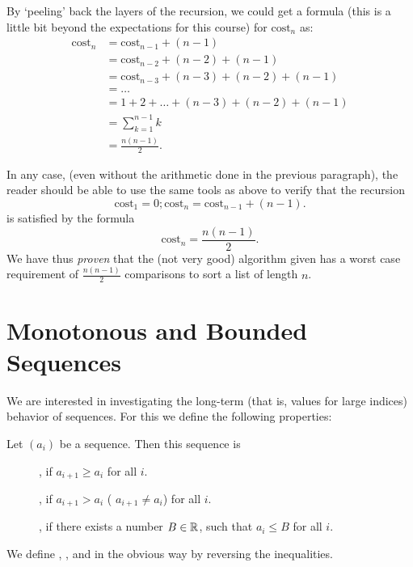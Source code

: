 By `peeling' back the layers of the recursion, we could get a formula (this
is a little bit beyond the expectations for this course) for
$\text{cost}_n$ as:
\begin{align*}
\text{cost}_n &=  \text{cost}_{n-1} + (n-1) \\
&=  \text{cost}_{n-2} +(n-2) + (n-1) \\
& =  \text{cost}_{n-3} + (n-3) +(n-2)+(n-1) \\
&=\ldots \\
&= 1 + 2 + \ldots + (n-3) + (n-2) + (n-1) \\
&= \sum_{k=1}^{n-1} k \\
&= \frac{n(n-1)}{2}.
\end{align*}

In any case, (even without the arithmetic done in the previous paragraph),
the reader should be able to use the same tools as above to verify that the
recursion
\[
\text{cost}_1=0; \text{cost}_n = \text{cost}_{n-1} + (n-1).
\]
is satisfied by the formula
\[
\text{cost}_n = \frac{n(n-1)}{2}.
\]
We have thus {\em proven} that the (not very good) algorithm given has a worst
case requirement of $\frac{n(n-1)}{2}$ comparisons to sort a list of length
$n$.


\section{Monotonous and Bounded Sequences}

We are interested in investigating the long-term (that is, values for large indices)
behavior of sequences. For this we define the following properties:
\begin{defn}
Let $(a_i)$ be a sequence. Then this sequence is
\begin{description}
\item[], if $a_{i+1}\ge a_i$ for all $i$.
\item[], if $a_{i+1}> a_i$
( $a_{i+1}\not=a_i$) for all $i$.
\item[], if there exists a number $B\in{\mathbb R}$, such that $a_i\le B$ for all $i$.
\end{description}
We define , ,
and  in the obvious way by reversing the inequalities.
\end{defn}

